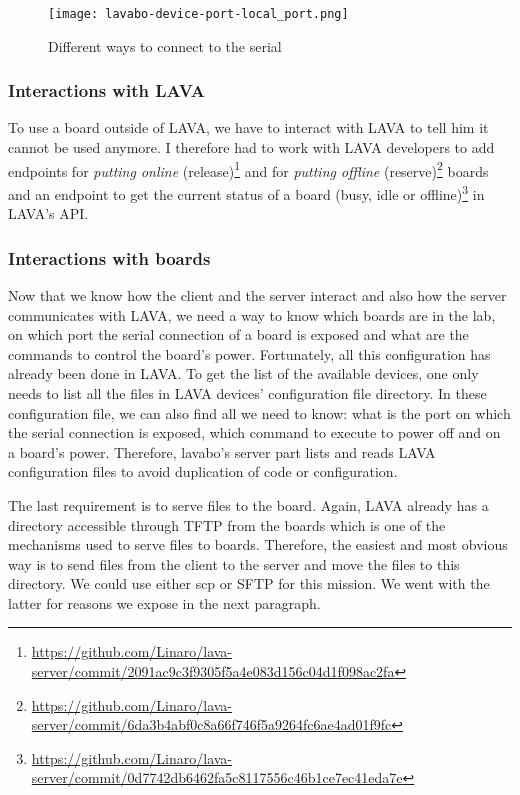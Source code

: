 \begin{figure}[H]
  \texttt{[image: lavabo-device-port-local\_port.png]}
  \caption{Different ways to connect to the serial}
\end{figure}

\subsubsection{Interactions with LAVA}

To use a board outside of LAVA, we have to interact with LAVA to tell him it cannot be used anymore. I therefore had to work with LAVA developers to add endpoints for \textit{putting online} (release)\footnote{\url{https://github.com/Linaro/lava-server/commit/2091ac9c3f9305f5a4e083d156c04d1f098ac2fa}} and for \textit{putting offline} (reserve)\footnote{\url{https://github.com/Linaro/lava-server/commit/6da3b4abf0c8a66f746f5a9264fc6ae4ad01f9fc}} boards and an endpoint to get the current status of a board (busy, idle or offline)\footnote{\url{https://github.com/Linaro/lava-server/commit/0d7742db6462fa5c8117556c46b1ce7ec41eda7e}} in LAVA's API.

\subsubsection{Interactions with boards}

Now that we know how the client and the server interact and also how the server communicates with LAVA, we need a way to know which boards are in the lab, on which port the serial connection of a board is exposed and what are the commands to control the board's power. Fortunately, all this configuration has already been done in LAVA. To get the list of the available devices, one only needs to list all the files in LAVA devices' configuration file directory. In these configuration file, we can also find all we need to know: what is the port on which the serial connection is exposed, which command to execute to power off and on a board's power. Therefore, lavabo's server part lists and reads LAVA configuration files to avoid duplication of code or configuration.

The last requirement is to serve files to the board. Again, LAVA already has a directory accessible through TFTP from the boards which is one of the mechanisms used to serve files to boards. Therefore, the easiest and most obvious way is to send files from the client to the server and move the files to this directory. We could use either scp or SFTP for this mission. We went with the latter for reasons we expose in the next paragraph.

